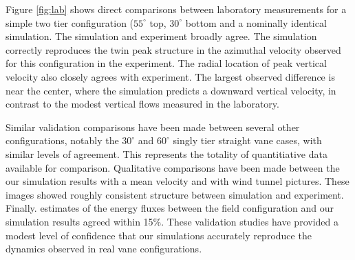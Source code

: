 Figure \ref{fig:lab} shows direct comparisons between laboratory measurements for a simple 
two tier configuration ($55^{\circ}$ top, $30^{\circ}$ bottom and 
a nominally identical simulation. The simulation and experiment broadly agree. The simulation 
correctly reproduces the twin peak structure in the azimuthal velocity 
observed for this configuration in the experiment. The radial location of peak vertical velocity also 
closely agrees with experiment. The largest observed difference is near the center, where the simulation predicts 
a downward vertical velocity, in contrast to the modest vertical flows measured in the laboratory. 

Similar validation comparisons have been made between several other configurations, notably the $30^{\circ}$ 
and $60^{\circ}$ singly tier straight vane cases, with similar levels of agreement. 
This represents the totality of quantitiative data available for comparison. Qualitative comparisons have been made
between the our simulation results with a mean velocity and with wind tunnel pictures. These images showed
roughly consistent structure between simulation and experiment. Finally. estimates of the energy fluxes between
the field configuration and our simulation results agreed within 15\%. These validation studies have provided a modest 
level of confidence that our simulations accurately reproduce the dynamics observed in real vane configurations. 

%
%

